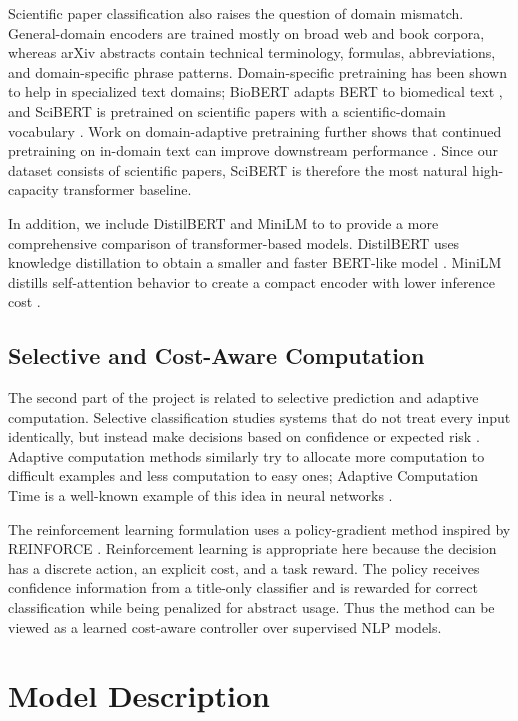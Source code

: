 \documentclass{article}
\begin{document}
Scientific paper classification also raises the question of domain mismatch. General-domain encoders are trained mostly on broad web and book corpora, whereas arXiv abstracts contain technical terminology, formulas, abbreviations, and domain-specific phrase patterns. Domain-specific pretraining has been shown to help in specialized text domains; BioBERT adapts BERT to biomedical text \cite{lee2020biobert}, and SciBERT is pretrained on scientific papers with a scientific-domain vocabulary \cite{beltagy2019scibert}. Work on domain-adaptive pretraining further shows that continued pretraining on in-domain text can improve downstream performance \cite{gururangan2020dont}. Since our dataset consists of scientific papers, SciBERT is therefore the most natural high-capacity transformer baseline.

In addition, we include DistilBERT and MiniLM to to provide a more comprehensive comparison of transformer-based models. DistilBERT uses knowledge distillation to obtain a smaller and faster BERT-like model \cite{sanh2019distilbert}. MiniLM distills self-attention behavior to create a compact encoder with lower inference cost \cite{wang2020minilm}. 

\subsection{Selective and Cost-Aware Computation}

The second part of the project is related to selective prediction and adaptive computation. Selective classification studies systems that do not treat every input identically, but instead make decisions based on confidence or expected risk \cite{geifman2017selective}. Adaptive computation methods similarly try to allocate more computation to difficult examples and less computation to easy ones; Adaptive Computation Time is a well-known example of this idea in neural networks \cite{graves2016adaptive}. 

The reinforcement learning formulation uses a policy-gradient method inspired by REINFORCE \cite{williams1992reinforce}. Reinforcement learning is appropriate here because the decision has a discrete action, an explicit cost, and a task reward. The policy receives confidence information from a title-only classifier and is rewarded for correct classification while being penalized for abstract usage. Thus the method can be viewed as a learned cost-aware controller over supervised NLP models.

\section{Model Description}
\end{document}
